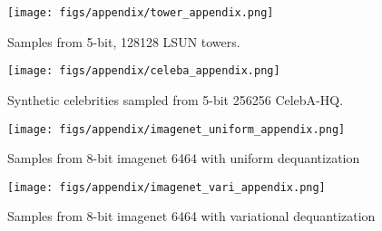 \documentclass{article}
\begin{document}
\newpage
\begin{figure}[t]
    \centering
    \texttt{[image: figs/appendix/tower\_appendix.png]}
    \caption{Samples from 5-bit, 128128 LSUN towers.}
    \label{fig:tower}
\end{figure}

\newpage
\begin{figure}[t]
    \centering
    \texttt{[image: figs/appendix/celeba\_appendix.png]}
    \caption{ Synthetic celebrities sampled from 5-bit 256256 CelebA-HQ.}
    \label{fig:celeba}
\end{figure}

\newpage
\begin{figure}[t]
    \centering
    \texttt{[image: figs/appendix/imagenet\_uniform\_appendix.png]}
    \caption{Samples from 8-bit imagenet 6464 with uniform  dequantization }
    \label{fig:imagenet-uni}
\end{figure}

\newpage
\begin{figure}[t]
    \centering
    \texttt{[image: figs/appendix/imagenet\_vari\_appendix.png]}
    \caption{Samples from 8-bit imagenet 6464 with variational  dequantization}
    \label{fig:imagenet-var}
\end{figure}
\end{document}
